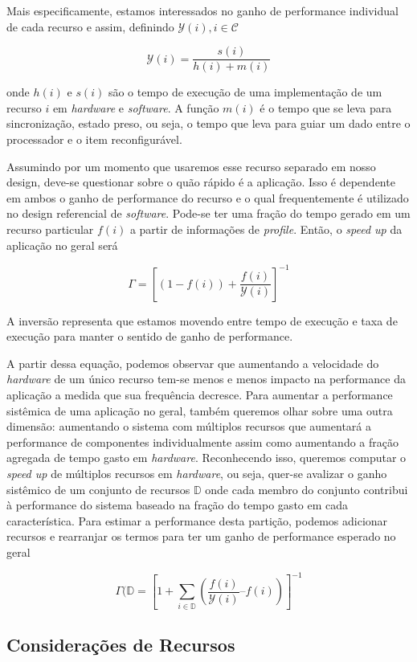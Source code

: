 Mais especificamente, estamos interessados no ganho de performance individual de cada recurso e assim, definindo $ \mathcal{Y}(i), i \in \mathcal{C} $

$$ \mathcal{Y}(i) = \frac{s(i)}{h(i) + m(i) } $$

onde $ h(i) $ e $ s(i) $ são o tempo de execução de uma implementação de um recurso $ i $ em \textit{hardware} e \textit{software}. A função $ m(i) $ é o tempo que se leva para sincronização, estado preso, ou seja, o tempo que leva para guiar um dado entre o processador e o item reconfigurável.

Assumindo por um momento que usaremos esse recurso separado em nosso design, deve-se questionar sobre o quão rápido é a aplicação. Isso é dependente em ambos o ganho de performance do recurso e o qual frequentemente é utilizado no design referencial de \textit{software}. Pode-se ter uma fração do tempo gerado em um recurso particular $ f(i) $ a partir de informações de \textit{profile}. Então, o \textit{speed up} da aplicação no geral será

$$ \Gamma = \left [ (1 - f(i)) + \frac{f(i)}{\mathcal{Y}(i)} \right ]^{-1}  $$

A inversão representa que estamos movendo entre tempo de execução e taxa de execução para manter o sentido de ganho de performance.

A partir dessa equação, podemos observar que aumentando a velocidade do \textit{hardware} de um único recurso tem-se menos e menos impacto na performance da aplicação a medida que sua frequência decresce. Para aumentar a performance sistêmica de uma aplicação no geral, também queremos olhar sobre uma outra dimensão: aumentando o sistema com múltiplos recursos que aumentará a performance de componentes individualmente assim como aumentando a fração agregada de tempo gasto em \textit{hardware}. Reconhecendo isso, queremos computar o \textit{speed up} de múltiplos recursos em \textit{hardware}, ou seja, quer-se avalizar o ganho sistêmico de um conjunto de recursos $ \mathbb{D} $ onde cada membro do conjunto contribui à performance do sistema baseado na fração do tempo gasto em cada característica. Para estimar a performance desta partição, podemos adicionar recursos e rearranjar os termos para ter um ganho de performance esperado no geral

$$ \Gamma (\mathbb{D} = \left [ 1 + \sum _{i \in \mathbb{D}} (\frac{f(i)}{\mathcal{Y}(i)} – f(i)) \right ]^{-1} $$



\subsection{Considerações de Recursos}

